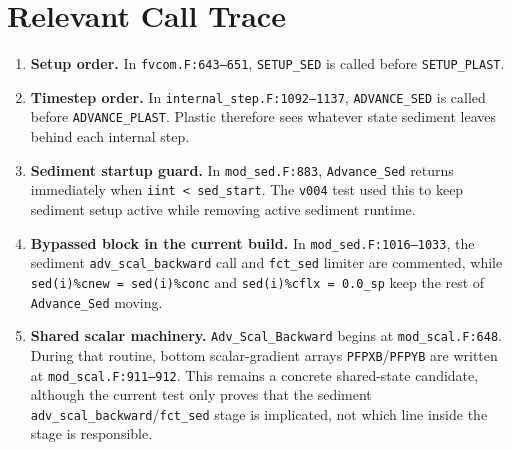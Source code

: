 \documentclass[11pt]{article}
\begin{document}
\section*{Relevant Call Trace}
\begin{enumerate}
\item \textbf{Setup order.} In \texttt{fvcom.F:643--651},
\texttt{SETUP\_SED} is called before \texttt{SETUP\_PLAST}.

\item \textbf{Timestep order.} In \texttt{internal\_step.F:1092--1137},
\texttt{ADVANCE\_SED} is called before \texttt{ADVANCE\_PLAST}.  Plastic
therefore sees whatever state sediment leaves behind each internal step.

\item \textbf{Sediment startup guard.} In \texttt{mod\_sed.F:883},
\texttt{Advance\_Sed} returns immediately when \texttt{iint < sed\_start}.  The
\texttt{v004} test used this to keep sediment setup active while removing
active sediment runtime.

\item \textbf{Bypassed block in the current build.} In
\texttt{mod\_sed.F:1016--1033}, the sediment
\texttt{adv\_scal\_backward} call and \texttt{fct\_sed} limiter are commented,
while \texttt{sed(i)\%cnew = sed(i)\%conc} and
\texttt{sed(i)\%cflx = 0.0\_sp} keep the rest of \texttt{Advance\_Sed} moving.

\item \textbf{Shared scalar machinery.} \texttt{Adv\_Scal\_Backward} begins at
\texttt{mod\_scal.F:648}.  During that routine, bottom scalar-gradient arrays
\texttt{PFPXB}/\texttt{PFPYB} are written at
\texttt{mod\_scal.F:911--912}.  This remains a concrete shared-state candidate,
although the current test only proves that the sediment
\texttt{adv\_scal\_backward}/\texttt{fct\_sed} stage is implicated, not which
line inside the stage is responsible.
\end{enumerate}
\end{document}
